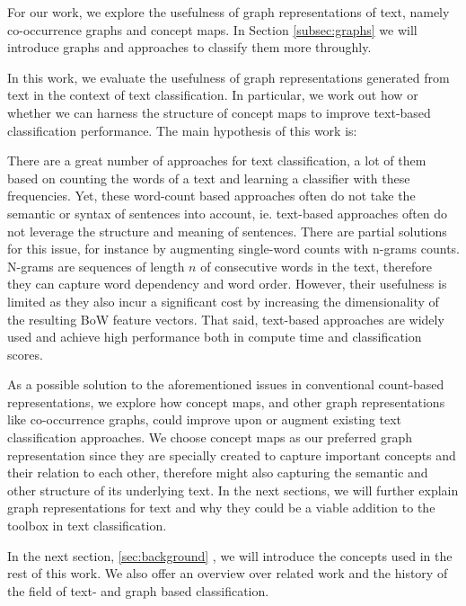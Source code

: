 For our work, we explore the usefulness of graph representations of text, namely co-occurrence graphs and concept maps.
In Section \ref{subsec:graphs} we will introduce graphs and approaches to classify them more throughly.

In this work, we evaluate the usefulness of graph representations generated from text in the context of text classification. In particular, we work out how or whether we can harness the structure of concept maps to improve text-based classification performance.
The main hypothesis of this work is:
\begin{quote}
\hypothesis
\end{quote}

There are a great number of approaches for text classification, a lot of them based on counting the words of a text and learning a classifier with these frequencies.
Yet, these word-count based approaches often do not take the semantic or syntax of sentences into account, ie. text-based approaches often do not leverage the structure and meaning of sentences.
There are partial solutions for this issue, for instance by augmenting single-word counts with n-grams counts.
N-grams are sequences of length $n$ of consecutive words in the text, therefore they can capture word dependency and word order.
However, their usefulness is limited as they also incur a significant cost by increasing the dimensionality of the resulting BoW feature vectors.
That said, text-based approaches are widely used and achieve high performance both in compute time and classification scores.

As a possible solution to the aforementioned issues in conventional count-based representations, we explore how concept maps, and other graph representations like co-occurrence graphs, could improve upon or augment existing text classification approaches.
We choose concept maps as our preferred graph representation since they are specially created to capture important concepts and their relation to each other, therefore might also capturing the semantic and other structure of its underlying text.
In the next sections, we will further explain graph representations for text and why they could be a viable addition to the toolbox in text classification.

In the next section, \ref{sec:background} , we will introduce the concepts used in the rest of this work.
We also offer an overview over related work and the history of the field of text- and graph based classification.

